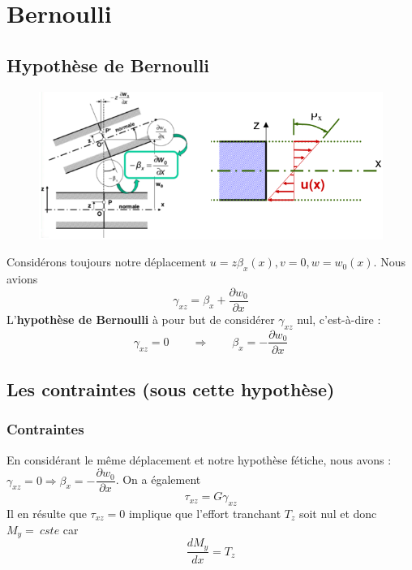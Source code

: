 \section{Bernoulli}
	\subsection{Hypothèse de Bernoulli}
	\begin{figure}
	\vspace{-5mm}
	\includegraphics[scale=0.45]{ch4/image4.png}
	\end{figure}
	Considérons toujours notre déplacement $u=z\beta_x(x), v=0,w=w_0(x)$.	
	Nous avions 
	\begin{equation}
	\gamma_{xz} = \beta_x+\dfrac{\partial w_0}{\partial x}
	\end{equation}
	L'\textbf{hypothèse de Bernoulli} à pour but de considérer $\gamma_{xz}$ 
	nul, c'est-à-dire :
	\begin{equation}
	\gamma_{xz} = 0\qquad\Longrightarrow\qquad \beta_x = -\dfrac{\partial w_0}{
	\partial x}
	\end{equation}
	 
	\newpage
	\subsection{Les contraintes (sous cette hypothèse)}
		\subsubsection{Contraintes}
		En considérant le même déplacement et notre hypothèse fétiche, nous 
		avons : $\gamma_{xz} = 0 \Longrightarrow \beta_x = -\dfrac{\partial w_0}{
		\partial x}$. On a également
		\begin{equation}
		\tau_{xz} = G\gamma_{xz}
		\end{equation}
		Il en résulte que $\tau_{xz}=0$ implique que l'effort tranchant $T_z$ soit 
		nul et donc $M_y =\ cste$ car 
		\begin{equation}
		\dfrac{dM_y}{dx} = T_z
		\end{equation}
		

